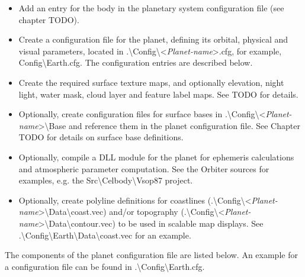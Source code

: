 \documentclass[Orbiter Developer Manual.tex]{subfiles}
\begin{document}
\begin{itemize}
\item Add an entry for the body in the planetary system configuration file (see chapter TODO).
\item Create a configuration file for the planet, defining its orbital, physical and visual parameters, located in .\textbackslash Config\textbackslash <\textit{Planet-name}>.cfg, for example, Config\textbackslash Earth.cfg. The configuration entries are described below.
\item Create the required surface texture maps, and optionally elevation, night light, water mask, cloud layer and feature label maps. See TODO for details.
\item Optionally, create configuration files for surface bases in .\textbackslash Config\textbackslash <\textit{Planet-name}>\textbackslash Base and reference them in the planet configuration file. See Chapter TODO for details on surface base definitions.
\item Optionally, compile a DLL module for the planet for ephemeris calculations and atmospheric parameter computation. See the Orbiter sources for examples, e.g. the Src\textbackslash Celbody\textbackslash Vsop87 project.
\item Optionally, create polyline definitions for coastlines (.\textbackslash Config\textbackslash <\textit{Planet-name}>\textbackslash Data\textbackslash coast.vec) and/or topography (.\textbackslash Config\textbackslash <\textit{Planet-name}>\textbackslash Data\textbackslash contour.vec) to be used in scalable map displays. See .\textbackslash Config\textbackslash Earth\textbackslash Data\textbackslash coast.vec for an example.
\end{itemize}

\noindent
The components of the planet configuration file are listed below. An example for a configuration file can be found in .\textbackslash Config\textbackslash Earth.cfg.
\end{document}
